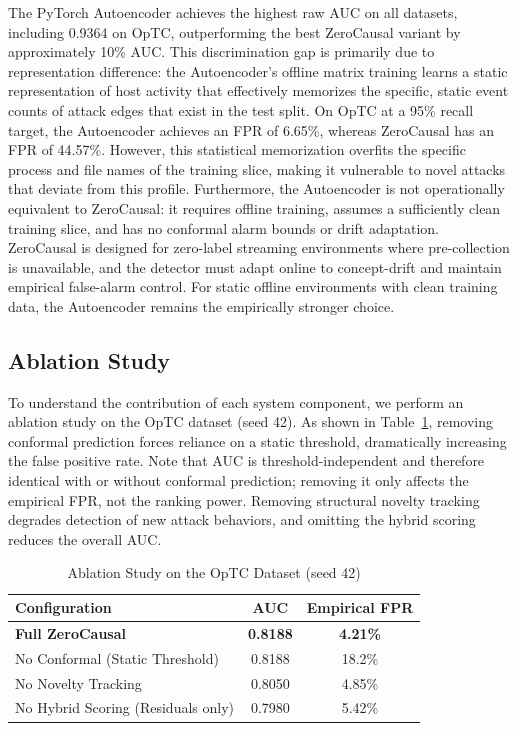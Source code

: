 The PyTorch Autoencoder achieves the highest raw AUC on all datasets, including 0.9364 on OpTC, outperforming the best ZeroCausal variant by approximately 10\% AUC. This discrimination gap is primarily due to representation difference: the Autoencoder's offline matrix training learns a static representation of host activity that effectively memorizes the specific, static event counts of attack edges that exist in the test split. On OpTC at a 95\% recall target, the Autoencoder achieves an FPR of 6.65\%, whereas ZeroCausal has an FPR of 44.57\%. However, this statistical memorization overfits the specific process and file names of the training slice, making it vulnerable to novel attacks that deviate from this profile. Furthermore, the Autoencoder is not operationally equivalent to ZeroCausal: it requires offline training, assumes a sufficiently clean training slice, and has no conformal alarm bounds or drift adaptation. ZeroCausal is designed for zero-label streaming environments where pre-collection is unavailable, and the detector must adapt online to concept-drift and maintain empirical false-alarm control. For static offline environments with clean training data, the Autoencoder remains the empirically stronger choice.

\subsection{Ablation Study}
To understand the contribution of each system component, we perform an ablation study on the OpTC dataset (seed 42). As shown in Table~\ref{tab:ablation}, removing conformal prediction forces reliance on a static threshold, dramatically increasing the false positive rate. Note that AUC is threshold-independent and therefore identical with or without conformal prediction; removing it only affects the empirical FPR, not the ranking power. Removing structural novelty tracking degrades detection of new attack behaviors, and omitting the hybrid scoring reduces the overall AUC.

\begin{table}[htbp]
\caption{Ablation Study on the OpTC Dataset (seed 42)}
\begin{center}
\begin{tabular}{|l|c|c|}
\hline
\textbf{Configuration} & \textbf{AUC} & \textbf{Empirical FPR} \\
\hline
\textbf{Full ZeroCausal} & \textbf{0.8188} & \textbf{4.21\%} \\
No Conformal (Static Threshold) & 0.8188 & 18.2\% \\
No Novelty Tracking & 0.8050 & 4.85\% \\
No Hybrid Scoring (Residuals only) & 0.7980 & 5.42\% \\
\hline
\end{tabular}
\label{tab:ablation}
\end{center}
\end{table}

